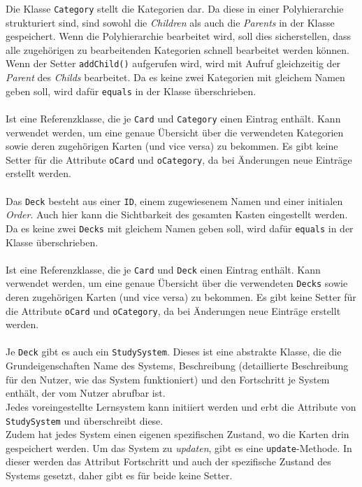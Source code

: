 \documentclass[fontsize=12pt,paper=a4,twoside]{scrartcl}
\begin{document}
\newpage
{}
Die Klasse \texttt{Category} stellt die Kategorien dar. Da diese in einer Polyhierarchie strukturiert sind, sind sowohl die \textit{Children} als auch die \textit{Parents} in der Klasse gespeichert. Wenn die Polyhierarchie bearbeitet wird, soll dies sicherstellen, dass alle zugehörigen zu bearbeitenden Kategorien schnell bearbeitet werden können. Wenn der Setter \texttt{addChild()} aufgerufen wird, wird mit Aufruf gleichzeitig der \textit{Parent} des \textit{Childs} bearbeitet. Da es keine zwei Kategorien mit gleichem Namen geben soll, wird dafür \texttt{equals} in der Klasse überschrieben.\\
\\

Ist eine Referenzklasse, die je \texttt{Card} und \texttt{Category} einen Eintrag enthält. Kann verwendet werden, um eine genaue Übersicht über die verwendeten Kategorien sowie deren zugehörigen Karten (und vice versa) zu bekommen. Es gibt keine Setter für die Attribute \texttt{oCard} und \texttt{oCategory}, da bei Änderungen neue Einträge erstellt werden.\\
\\

Das \texttt{Deck} besteht aus einer \texttt{ID}, einem zugewiesenem Namen und einer initialen \textit{Order}. Auch hier kann die Sichtbarkeit des gesamten Kasten eingestellt werden. Da es keine zwei \texttt{Decks} mit gleichem Namen geben soll, wird dafür \texttt{equals} in der Klasse überschrieben. \\
\\

Ist eine Referenzklasse, die je \texttt{Card} und \texttt{Deck} einen Eintrag enthält. Kann verwendet werden, um eine genaue Übersicht über die verwendeten \texttt{Decks} sowie deren zugehörigen Karten (und vice versa) zu bekommen. Es gibt keine Setter für die Attribute \texttt{oCard} und \texttt{oCategory}, da bei Änderungen neue Einträge erstellt werden.\\
\\

\newpage
{}
Je \texttt{Deck} gibt es auch ein \texttt{StudySystem}. Dieses ist eine abstrakte Klasse, die die Grundeigenschaften Name des Systems, Beschreibung (detaillierte Beschreibung für den Nutzer, wie das System funktioniert) und den Fortschritt je System enthält, der vom Nutzer abrufbar ist. \\
Jedes voreingestellte Lernsystem kann initiiert werden und erbt die Attribute von \texttt{StudySystem} und überschreibt diese. \\
Zudem hat jedes System einen eigenen spezifischen Zustand, wo die Karten drin gespeichert werden. Um das System zu \textit{updaten}, gibt es eine \texttt{update}-Methode. In dieser werden das Attribut Fortschritt und auch der spezifische Zustand des Systems gesetzt, daher gibt es für beide keine Setter.\\
\\
\end{document}
